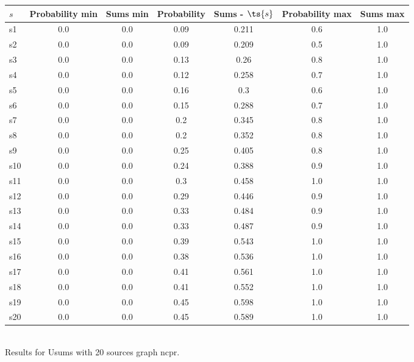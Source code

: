 \documentclass{article}
\begin{document}
\noindent\begin{tabular}{|l|c|c|c|c|c|c|}
\hline
$s$& Probability min & Sums min & Probability & Sums - $\ts{s}$ & Probability max & Sums max\\
\hline
s1 &0.0 & 0.0 & 0.09 & 0.211 & 0.6 & 1.0\\
\hline
s2 &0.0 & 0.0 & 0.09 & 0.209 & 0.5 & 1.0\\
\hline
s3 &0.0 & 0.0 & 0.13 & 0.26 & 0.8 & 1.0\\
\hline
s4 &0.0 & 0.0 & 0.12 & 0.258 & 0.7 & 1.0\\
\hline
s5 &0.0 & 0.0 & 0.16 & 0.3 & 0.6 & 1.0\\
\hline
s6 &0.0 & 0.0 & 0.15 & 0.288 & 0.7 & 1.0\\
\hline
s7 &0.0 & 0.0 & 0.2 & 0.345 & 0.8 & 1.0\\
\hline
s8 &0.0 & 0.0 & 0.2 & 0.352 & 0.8 & 1.0\\
\hline
s9 &0.0 & 0.0 & 0.25 & 0.405 & 0.8 & 1.0\\
\hline
s10 &0.0 & 0.0 & 0.24 & 0.388 & 0.9 & 1.0\\
\hline
s11 &0.0 & 0.0 & 0.3 & 0.458 & 1.0 & 1.0\\
\hline
s12 &0.0 & 0.0 & 0.29 & 0.446 & 0.9 & 1.0\\
\hline
s13 &0.0 & 0.0 & 0.33 & 0.484 & 0.9 & 1.0\\
\hline
s14 &0.0 & 0.0 & 0.33 & 0.487 & 0.9 & 1.0\\
\hline
s15 &0.0 & 0.0 & 0.39 & 0.543 & 1.0 & 1.0\\
\hline
s16 &0.0 & 0.0 & 0.38 & 0.536 & 1.0 & 1.0\\
\hline
s17 &0.0 & 0.0 & 0.41 & 0.561 & 1.0 & 1.0\\
\hline
s18 &0.0 & 0.0 & 0.41 & 0.552 & 1.0 & 1.0\\
\hline
s19 &0.0 & 0.0 & 0.45 & 0.598 & 1.0 & 1.0\\
\hline
s20 &0.0 & 0.0 & 0.45 & 0.589 & 1.0 & 1.0\\
\hline
\end{tabular}\\

\noindent Results for Usums with 20 sources graph ncpr.
\end{document}
